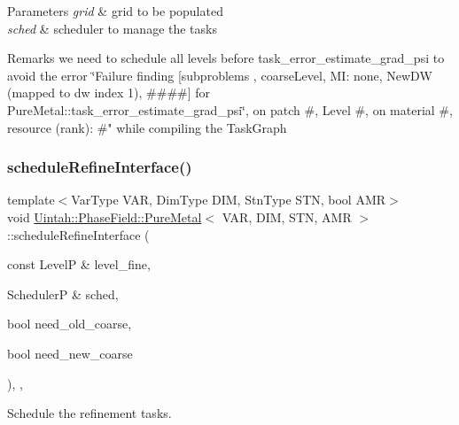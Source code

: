 \begin{DoxyParams}{Parameters}
{\em grid} & grid to be populated \\
\hline
{\em sched} & scheduler to manage the tasks\\
\hline
\end{DoxyParams}
\begin{DoxyRemark}{Remarks}
we need to schedule all levels before task\+\_\+error\+\_\+estimate\+\_\+grad\+\_\+psi to avoid the error \char`\"{}\+Failure finding \mbox{[}subproblems , coarse\+Level, M\+I\+: none, New\+D\+W
(mapped to dw index 1), \#\#\#\#\mbox{]} for Pure\+Metal\+::task\+\_\+error\+\_\+estimate\+\_\+grad\+\_\+psi\char`\"{}, on patch \#, Level \#, on material \#, resource (rank)\+: \#" while compiling the Task\+Graph 
\end{DoxyRemark}
\mbox{\label{classUintah_1_1PhaseField_1_1PureMetal_a3198fbaa73fbcb094f12b806a7c5caff}} 
\subsubsection{\texorpdfstring{schedule\+Refine\+Interface()}{scheduleRefineInterface()}}
{\footnotesize\ttfamily template$<$Var\+Type V\+AR, Dim\+Type D\+IM, Stn\+Type S\+TN, bool A\+MR$>$ \\
void \hyperlink{classUintah_1_1PhaseField_1_1PureMetal}{Uintah\+::\+Phase\+Field\+::\+Pure\+Metal}$<$ V\+AR, D\+IM, S\+TN, A\+MR $>$\+::schedule\+Refine\+Interface (\begin{DoxyParamCaption}\item[{const LevelP \&}]{level\+\_\+fine,  }\item[{SchedulerP \&}]{sched,  }\item[{bool}]{need\+\_\+old\+\_\+coarse,  }\item[{bool}]{need\+\_\+new\+\_\+coarse }\end{DoxyParamCaption})\hspace{0.3cm}{\ttfamily [override]}, {\ttfamily [protected]}, {\ttfamily [virtual]}}



Schedule the refinement tasks. 

